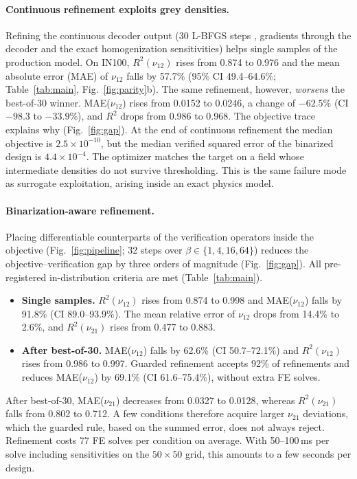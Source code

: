 \documentclass[a4paper,11pt]{article}
\newcommand{\nuot}{\nu_{12}}
\newcommand{\nuto}{\nu_{21}}
\newcommand{\RR}{R^2}
\begin{document}
\paragraph{Continuous refinement exploits grey densities.}
Refining the continuous decoder output (30 L-BFGS steps
\citep{liu1989lbfgs}, gradients through the decoder and the exact
homogenization sensitivities) helps single samples of the production model.
On IN100, $\RR(\nuot)$ rises from 0.874 to 0.976 and the mean absolute error
(MAE) of $\nuot$ falls by 57.7\% (95\% CI 49.4--64.6\%;
Table~\ref{tab:main}, Fig.~\ref{fig:parity}b). The same refinement, however,
\emph{worsens} the best-of-30 winner. MAE($\nuot$) rises from 0.0152 to
0.0246, a change of $-62.5\%$ (CI $-98.3$ to $-33.9\%$), and $\RR$ drops from
0.986 to 0.968. The objective trace explains why
(Fig.~\ref{fig:gap}). At the end of continuous refinement the median
objective is $2.5\times10^{-10}$, but the median verified squared error of
the binarized design is $4.4\times10^{-4}$. The optimizer matches the target
on a field whose intermediate densities do not survive thresholding. This is
the same failure mode as surrogate exploitation, arising inside an exact
physics model.

\paragraph{Binarization-aware refinement.}
Placing differentiable counterparts of the verification operators inside the
objective (Fig.~\ref{fig:pipeline}; 32 steps over $\beta\in\{1,4,16,64\}$)
reduces the objective--verification gap by three orders of magnitude
(Fig.~\ref{fig:gap}). All pre-registered in-distribution criteria are met
(Table~\ref{tab:main}).
\begin{itemize}
\item \textbf{Single samples.} $\RR(\nuot)$ rises from 0.874 to 0.998 and
MAE($\nuot$) falls by 91.8\% (CI 89.0--93.9\%). The mean relative error of
$\nuot$ drops from 14.4\% to 2.6\%, and $\RR(\nuto)$ rises from 0.477 to
0.883.
\item \textbf{After best-of-30.} MAE($\nuot$) falls by 62.6\% (CI
50.7--72.1\%) and $\RR(\nuot)$ rises from 0.986 to 0.997. Guarded refinement
accepts 92\% of refinements and reduces MAE($\nuot$) by 69.1\% (CI
61.6--75.4\%), without extra FE solves.
\end{itemize}
After best-of-30, MAE($\nuto$) decreases from 0.0327 to 0.0128, whereas
$\RR(\nuto)$ falls from 0.802 to 0.712. A few conditions therefore acquire
larger $\nuto$ deviations, which the guarded rule, based on the summed error,
does not always reject. Refinement costs 77 FE solves per condition on
average. With 50--100\,ms per solve including sensitivities on the
$50\times50$ grid, this amounts to a few seconds per design.
\end{document}
